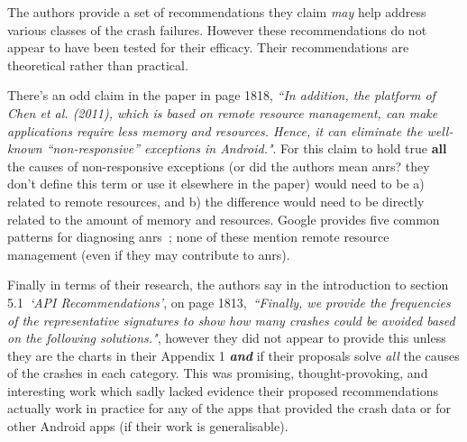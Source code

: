 The authors provide a set of recommendations they claim \emph{may} help address various classes of the crash failures. However these recommendations do not appear to have been tested for their efficacy. Their recommendations are theoretical rather than practical. 

There's an odd claim in the paper in page 1818, \emph{``In addition, the platform of Chen et al. (2011), which is based on remote resource management, can make applications require less memory and resources. Hence, it can eliminate the well-known “non-responsive” exceptions in Android."}. For this claim to hold true \textbf{all} the causes of non-responsive exceptions (or did the authors mean \glspl{anr}? they don't define this term or use it elsewhere in the paper) would need to be a) related to remote resources, and b) the difference would need to be directly related to the amount of memory and resources. Google provides five common patterns for diagnosing \glspl{anr}~; none of these mention remote resource management (even if they may contribute to \glspl{anr}). 

Finally in terms of their research, the authors say in the introduction to section 5.1~\emph{`API Recommendations'}, on page 1813,~\emph{``Finally, we provide the frequencies of the representative signatures to show how many crashes could be avoided based on the following solutions."}, however they did not appear to provide this unless they are the charts in their Appendix 1 \textbf{\emph{and}} if their proposals solve \emph{all} the causes of the crashes in each category. This was promising, thought-provoking, and interesting work which sadly lacked evidence their proposed recommendations actually work in practice for any of the apps that provided the crash data or for other Android apps (if their work is generalisable).


